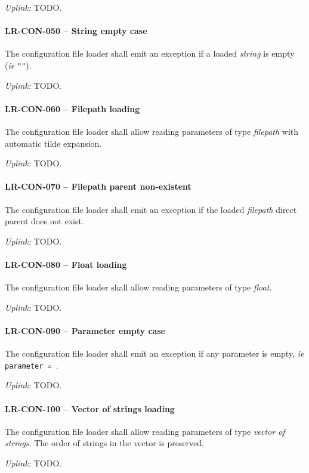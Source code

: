 \textit{Uplink: } TODO.

\paragraph{LR-CON-050 -- String empty case}
The configuration file loader shall emit an exception if a loaded
\emph{string} is empty (\textit{ie} \lstinline{""}).

\textit{Uplink: } TODO.

\paragraph{LR-CON-060 -- Filepath loading}
The configuration file loader shall allow reading parameters of type
\emph{filepath} with automatic tilde expansion.

\textit{Uplink: } TODO.

\paragraph{LR-CON-070 -- Filepath parent non-existent}
The configuration file loader shall emit an exception if the loaded
\emph{filepath} direct parent does not exist.

\textit{Uplink: } TODO.

\paragraph{LR-CON-080 -- Float loading}
The configuration file loader shall allow reading parameters of type
\emph{float}.

\textit{Uplink: } TODO.

\paragraph{LR-CON-090 -- Parameter empty case}
The configuration file loader shall emit an exception if any parameter
is empty, \textit{ie} \lstinline{parameter = }.

\textit{Uplink: } TODO.

\paragraph{LR-CON-100 -- Vector of strings loading}
The configuration file loader shall allow reading parameters of type
\emph{vector of strings}. The order of strings in the vector is preserved.

\textit{Uplink: } TODO.

